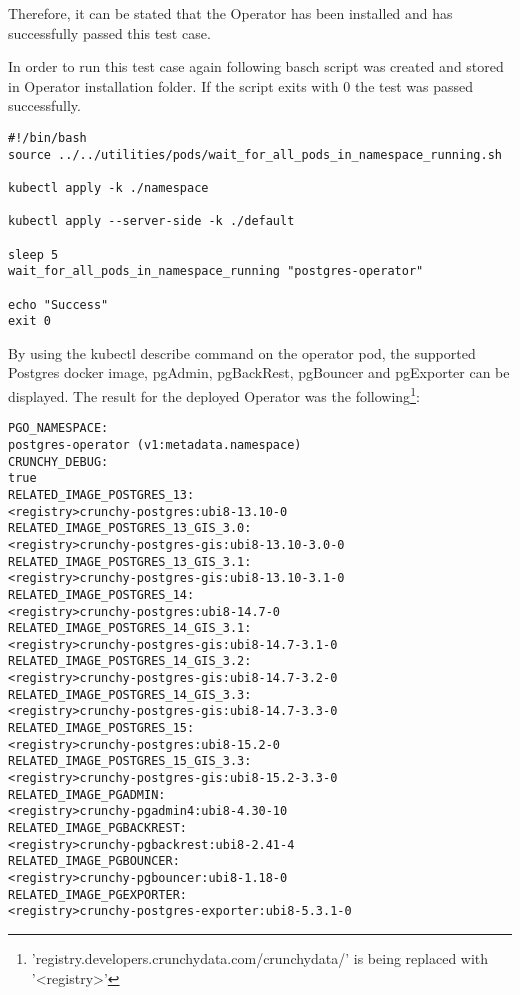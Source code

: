 Therefore, it can be stated that the Operator has been installed and has successfully passed this test case.

In order to run this test case again following basch script was created and stored in Operator installation folder. If the script exits with 0 the test was passed successfully.

\begin{verbatim}
#!/bin/bash
source ../../utilities/pods/wait_for_all_pods_in_namespace_running.sh

kubectl apply -k ./namespace

kubectl apply --server-side -k ./default

sleep 5
wait_for_all_pods_in_namespace_running "postgres-operator"

echo "Success"
exit 0
\end{verbatim}


\label{chap:pgoclusterinstall}
By using the kubectl describe command on the operator pod, the supported Postgres docker image, pgAdmin, pgBackRest, pgBouncer and pgExporter can be displayed. The result for the deployed Operator was the following\footnote{'registry.developers.crunchydata.com/crunchydata/' is being replaced with '<registry>'}:

\begin{verbatim}
PGO_NAMESPACE:                      
postgres-operator (v1:metadata.namespace)                                    
CRUNCHY_DEBUG:                      
true                                  
RELATED_IMAGE_POSTGRES_13:          
<registry>crunchy-postgres:ubi8-13.10-0
RELATED_IMAGE_POSTGRES_13_GIS_3.0:  
<registry>crunchy-postgres-gis:ubi8-13.10-3.0-0                               
RELATED_IMAGE_POSTGRES_13_GIS_3.1:  
<registry>crunchy-postgres-gis:ubi8-13.10-3.1-0                               
RELATED_IMAGE_POSTGRES_14:          
<registry>crunchy-postgres:ubi8-14.7-0 
RELATED_IMAGE_POSTGRES_14_GIS_3.1:  
<registry>crunchy-postgres-gis:ubi8-14.7-3.1-0                                
RELATED_IMAGE_POSTGRES_14_GIS_3.2:  
<registry>crunchy-postgres-gis:ubi8-14.7-3.2-0                                
RELATED_IMAGE_POSTGRES_14_GIS_3.3:  
<registry>crunchy-postgres-gis:ubi8-14.7-3.3-0                                
RELATED_IMAGE_POSTGRES_15:          
<registry>crunchy-postgres:ubi8-15.2-0 
RELATED_IMAGE_POSTGRES_15_GIS_3.3:  
<registry>crunchy-postgres-gis:ubi8-15.2-3.3-0                                
RELATED_IMAGE_PGADMIN:              
<registry>crunchy-pgadmin4:ubi8-4.30-10
RELATED_IMAGE_PGBACKREST:           
<registry>crunchy-pgbackrest:ubi8-2.41-4                                      
RELATED_IMAGE_PGBOUNCER:            
<registry>crunchy-pgbouncer:ubi8-1.18-0
RELATED_IMAGE_PGEXPORTER:           
<registry>crunchy-postgres-exporter:ubi8-5.3.1-0
\end{verbatim}

